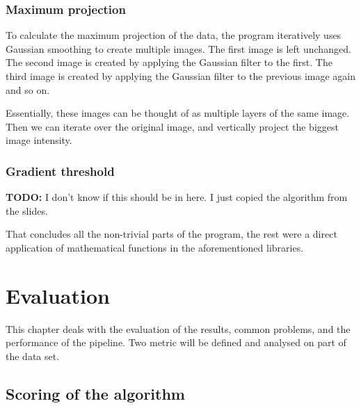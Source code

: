 \documentclass[
  digital,     %
  oneside,     %
  nosansbold,  %
  nocolorbold, %
  lof,         %
  lot,         %
]{fithesis4}
\begin{document}
\subsection{Maximum projection} 
\label{sec:max-proj}
To calculate the maximum projection of the data, the program iteratively uses
Gaussian smoothing to create multiple images. The first image is left unchanged.
The second image is created by applying the Gaussian filter to the first. The
third image is created by applying the Gaussian filter to the previous image
again and so on.

Essentially, these images can be thought of as multiple layers of the same
image. Then we can iterate over the original image, and vertically project the
biggest image intensity.

\subsection{Gradient threshold}
\textbf{TODO:} I don't know if this should be in here. I just copied the
algorithm from the slides.

That concludes all the non-trivial parts of the program, the rest were a direct
application of mathematical functions in the aforementioned libraries.

\chapter{Evaluation}
\label{chp:evaluation}
This chapter deals with the evaluation of the results, common problems, and the
performance of the pipeline. Two metric will be defined and analysed on part of
the data set.

\section{Scoring of the algorithm}
\end{document}
